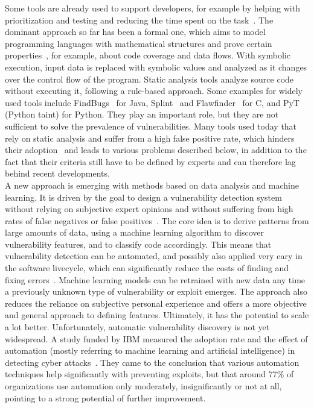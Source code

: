 \documentclass[
a4paper,
pagesize,
pdftex,
12pt,
twoside, %
BCOR=5mm, %
ngerman,
fleqn,
final,
]{scrartcl}
\begin{document}
	Some tools are already used to support developers, for example by helping with prioritization and testing and reducing the time spent on the task~\cite{Dam.2017}. The dominant approach so far has been a formal one, which aims to model programming languages with mathematical structures and prove certain properties~\cite{Allamanis.2018}, for example, about code coverage and data flows. With symbolic execution, input data is replaced with symbolic values and analyzed as it changes over the control flow of the program. Static analysis tools analyze source code without executing it, following a rule-based approach. Some examples for widely used tools include FindBugs~\cite{Hovemeyer.2004,Hovemeyer.2005} for Java, Splint~\cite{Evans.2002} and Flawfinder~\cite{Wheeler.2006} for C, and PyT~\cite{Micheelsen.2016} (Python taint) for Python. They play an important role, but they are not sufficient to solve the prevalence of vulnerabilities. Many tools used today that rely on static analysis and suffer from a high false positive rate, which hinders their adoption~\cite{Liu.2018} and leads to various problems described below, in addition to the fact that their criteria still have to be defined by experts and can therefore lag behind recent developments.\\
	A new approach is emerging with methods based on data analysis and machine learning. It is driven by the goal to design a vulnerability detection system without relying on subjective expert opinions and without suffering from high rates of false negatives or false positives~\cite{Li.2018}. The core idea is to derive patterns from large amounts of data, using a machine learning algorithm to discover vulnerability features, and to classify code accordingly. This means that vulnerability detection can be automated, and possibly also applied very eary in the software livecycle, which can significantly reduce the costs of finding and fixing errors~\cite{Dam.2017,Gupta.2014}. Machine learning models can be retrained with new data any time a previously unknown type of vulnerability or exploit emerges. The approach also reduces the reliance on subjective personal experience and offers a more objective and general approach to defining features. Ultimately, it has the potential to scale a lot better. Unfortunately, automatic vulnerability discovery is not yet widespread. A study funded by IBM measured the adoption rate and the effect of automation (mostly referring to machine learning and artificial intelligence) in detecting cyber attacks~\cite{IBMNewsRoom.}. They came to the conclusion that various automation techniques help significantly with preventing exploits, but that around 77\% of organizations use automation only moderately, insignificantly or not at all, pointing to a strong potential of further improvement. 
	
\end{document}
